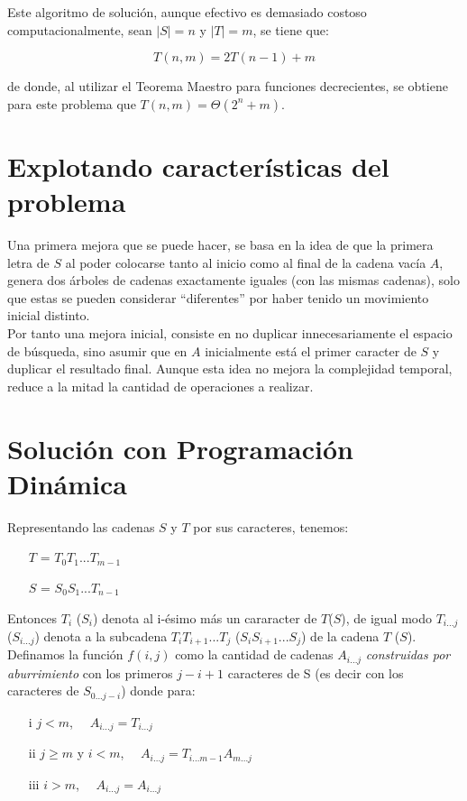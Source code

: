 \documentclass[a4paper]{article}
\begin{document}
    Este algoritmo de soluci\'on, aunque efectivo es demasiado costoso computacionalmente, sean $|S| = n$ y $|T| = m$, se tiene que:

    \begin{equation*}
        T(n,m) = 2 T(n-1) + m 
    \end{equation*}

    de donde, al utilizar el Teorema Maestro para funciones decrecientes, se obtiene para este problema que 
     $T(n,m) = \Theta(2^n + m)$.

    \section*{Explotando caracter\'isticas del problema}
    Una primera mejora que se puede hacer, se basa en la idea de que la primera letra de $S$ 
    al poder colocarse tanto al inicio como al final de la cadena vac\'ia $A$, genera dos \'arboles de cadenas exactamente iguales (con las mismas cadenas), solo que estas se pueden considerar ``diferentes'' por 
    haber tenido un movimiento inicial distinto.\\ 

    Por tanto una mejora inicial, consiste en no duplicar innecesariamente el espacio de b\'usqueda, sino asumir que en $A$ inicialmente 
    est\'a el primer caracter de $S$ y duplicar el resultado final. Aunque esta idea no mejora la complejidad temporal, reduce a la mitad la cantidad de operaciones a realizar.

    \section*{Soluci\'on con Programaci\'on Din\'amica}

    Representando las cadenas $S$ y $T$ por sus caracteres, tenemos:

    \begin{itemize}
        \item[] $T$ = $T_0T_1 ... T_{m-1}$
        \item[] $S$ = $S_0S_1 ... T_{n-1}$ 
    \end{itemize}

    Entonces $T_i$ ($S_i$) denota al i-\'esimo m\'as un cararacter de $T$($S$), de igual modo 
    $T_{i...j}$($S_{i...j}$) denota a la subcadena $T_iT_{i+1}...T_j$ ($S_iS_{i+1}...S_{j}$) de la cadena $T$ ($S$).\\
    
    Definamos la funci\'on $f(i,j)$ como la cantidad de cadenas $A_{i...j}$ \textit{construidas por aburrimiento} con los primeros $j-i+1$ 
    caracteres de S (es decir con los caracteres de $S_{0...j-i}$) donde 
    para:
    \begin{itemize}
    	\item[i] $j < m$, $\quad A_{i...j} = T_{i...j}$
    	\item[ii] $j \geq m $ y $i < m $, $\quad A_{i...j} = T_{i...m-1}A_{m...j}$
    	\item[iii] $i > m $, $\quad A_{i...j} = A_{i...j}$
    \end{itemize}
    
\end{document}
